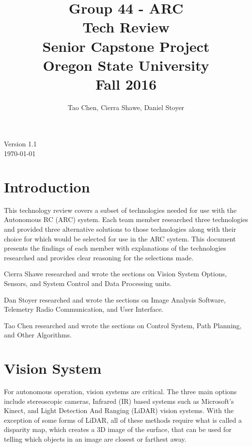 \documentclass[compsoc,draftclsnofoot,onecolumn,10pt]{IEEEtran}
\begin{document}
\begin{titlepage}
\title{
Group 44 - ARC \\
Tech Review\\
\LARGE
Senior Capstone Project\\
Oregon State University\\
Fall 2016
}

\author{Tao Chen, Cierra Shawe, Daniel Stoyer}
\maketitle
\begin{center}
	Version 1.1\\
	\today
\end{center}

\thispagestyle{empty} %

\end{titlepage}
\newpage

\tableofcontents

\newpage

\section{Introduction}
This technology review covers a subset of technologies needed for use with the
Autonomous RC (ARC) system. Each team member researched three technologies and provided
three alternative solutions to those technologies along with their choice for
which would be selected for use in the ARC system. This document presents the
findings of each member with explanations of the technologies researched and
provides clear reasoning for the selections made.\par
Cierra Shawe researched and wrote the sections on Vision System Options,
Sensors, and System Control and Data Processing units.\par
Dan Stoyer researched and wrote the sections on Image Analysis Software,
Telemetry Radio Communication, and User Interface.\par
Tao Chen researched and wrote the sections on Control System, Path Planning, and
Other Algorithms.\par

\newpage

\section{Vision System} %
For autonomous operation, vision systems are critical. 
The three main options include stereoscopic cameras, Infrared (IR) based systems such as Microsoft's Kinect, and Light Detection And Ranging (LiDAR) vision systems. 
With the exception of some forms of LiDAR, all of these methods require what is called a disparity map, which creates a 3D image of the surface, that can be used for telling which objects in an image are closest or farthest away. 
\end{document}
